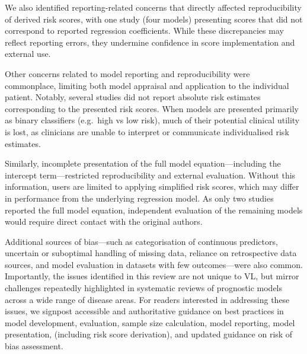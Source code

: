 We also identified reporting-related concerns that directly affected reproducibility of derived risk scores, with one study (four models) presenting scores that did not correspond to reported regression coefficients. While these discrepancies may reflect reporting errors, they undermine confidence in score implementation and external use.

Other concerns related to model reporting and reproducibility were commonplace, limiting both model appraisal and application to the individual patient. Notably, several studies did not report absolute risk estimates corresponding to the presented risk scores\cite{werneckPrognosticFactorsDeath2003,dearaujoEarlyClinicalManifestations2012,sampaioRiskFactorsDeath2010,foinquinosTemporalValidationPredictive2021}. When models are presented primarily as binary classifiers (e.g.\ high vs low risk), much of their potential clinical utility is lost, as clinicians are unable to interpret or communicate individualised risk estimates.

Similarly, incomplete presentation of the full model equation—including the intercept term—restricted reproducibility and external evaluation. Without this information, users are limited to applying simplified risk scores, which may differ in performance from the underlying regression model\cite{moons2019}. As only two studies reported the full model equation\cite{coura-vitalPrognosticFactorsScoring2014,foinquinosTemporalValidationPredictive2021}, independent evaluation of the remaining models would require direct contact with the original authors.

Additional sources of bias—such as categorisation of continuous predictors, uncertain or suboptimal handling of missing data, reliance on retrospective data sources, and model evaluation in datasets with few outcomes—were also common. Importantly, the issues identified in this review are not unique to VL, but mirror challenges repeatedly highlighted in systematic reviews of prognostic models across a wide range of disease areas\cite{moons2019,wynants2020,collins2024A, damen2016,bellou2019}. For readers interested in addressing these issues, we signpost accessible and authoritative guidance on best practices in model development\cite{efthimiou2024}, evaluation\cite{collins2024B,riley2024A}, sample size calculation\cite{rileyCalculatingSampleSize2020,riley2024B}, model reporting\cite{collins2024A}, model presentation, (including risk score derivation)\cite{bonnettGuidePresentingClinical2019}, and updated guidance on risk of bias assessment\cite{moons2025}.

